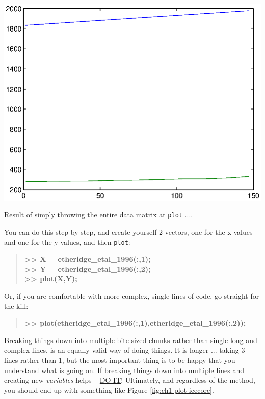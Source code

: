 \documentclass{tufte-book} %
\newenvironment{docspec}{\begin{quotation}\ttfamily\parskip0pt\parindent0pt\ignorespaces}{\end{quotation}}
\begin{document}
\begin{marginfigure}[-0.5in]
\includegraphics[width=\linewidth]{ch1-plot-icecore_default.eps}
\caption{Result of simply throwing the entire data matrix at \texttt{plot} ....}
\label{fig:ch1-plot-icecore_default}
\end{marginfigure}

You can do this step-by-step, and create yourself 2 vectors, one for the x-values and one for the y-values, and then \texttt{plot}:

\begin{docspec}
\textbf{>> X = etheridge\_etal\_1996(:,1);\\
>> Y = etheridge\_etal\_1996(:,2);\\
>> plot(X,Y);}
\end{docspec}

Or, if you are comfortable with more complex, single lines of code, go straight for the kill:

\begin{docspec}
\textbf{>> plot(etheridge\_etal\_1996(:,1),etheridge\_etal\_1996(:,2));}
\end{docspec}

Breaking things down into multiple bite-sized chunks rather than single long and complex lines,  is an equally valid way of doing things. It is longer ... taking 3 lines rather than 1, but the most important thing is to be happy that you understand what is going on. If breaking things down into multiple lines and creating new \textit{variables} helps -- \uline{DO IT}! Ultimately, and regardless of the method, you should end up with something like Figure \ref{fig:ch1-plot-icecore}.
\end{document}

